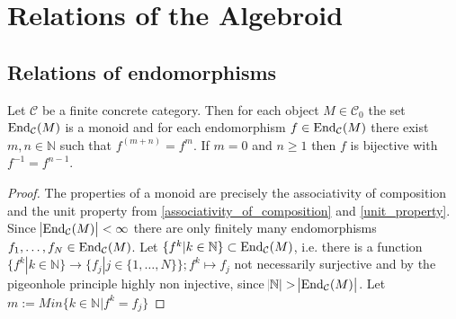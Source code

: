 
\section{Relations of the Algebroid}

\subsection{Relations of endomorphisms}

\begin{lemma}
Let $\mathcal{C}$ be a finite concrete category. Then for each object $M \in \mathcal{C}_{0}$ the set
$\textup{End}_{\mathcal{C}}(M)$ is a monoid and for each endomorphism $f \in \textup{End}_{\mathcal{C}}(M)$
there exist $m,n \in \mathbb{N}$ such that $f^{(m+n)}=f^{m}$. If $m = 0$ and $n \geq 1$ then $f$ is bijective with $f^{-1} = f^{n-1}$.
\begin{proof}
The properties of a monoid are precisely the associativity of composition and the unit property from \ref{associativity_of_composition} and \ref{unit_property}.
Since $\abs{\textup{End}_{\mathcal{C}}(M)}<\infty$ there are only finitely many endomorphisms $f_{1},\dots, f_{N} \in \textup{End}_{\mathcal{C}}(M)$.
Let $\{f^{k} | k \in \mathbb{N} \} \subset \textup{End}_{\mathcal{C}}(M)$, i.e. there is a function 
$\{f^{k} | k \in \mathbb{N}\} \rightarrow \{f_{j} | j \in \{1,\dots,N\}\}; f^{k} \mapsto f_{j}$ not necessarily surjective and 
by the pigeonhole principle highly non injective, since $\abs{\mathbb{N}}>\abs{\textup{End}_{\mathcal{C}}(M)}$.
Let $m := Min \{ k \in \mathbb{N}| f^{k} =  f_{j} \}$

\begin{minipage}{.45\textwidth}\phantom{}\end{minipage}
\end{proof}
\end{lemma}